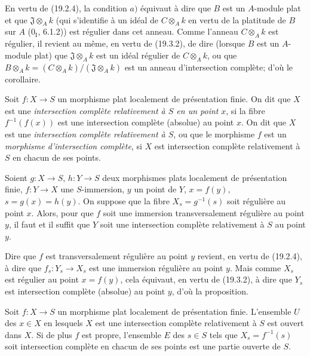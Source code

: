 
En vertu de (19.2.4), la condition $a)$ équivaut à dire que $B$ est un $A$-module plat et que $\mathfrak J\otimes_A k$ (qui s'identifie à un idéal de $C\otimes_A k$ en vertu de la platitude de $B$ sur $A$ ($0_{\mathrm I}$, 6.1.2)) est régulier dans cet anneau. Comme l'anneau $C\otimes_A k$ est régulier, il revient au même, en vertu de (19.3.2), de dire (lorsque $B$ est un $A$-module plat) que $\mathfrak J\otimes_A k$ est un idéal régulier de $C\otimes_A k$, ou que $B\otimes_A k=(C\otimes_A k)/(\mathfrak J\otimes_A k)$ est un anneau d'intersection complète; d'où le corollaire.

\begin{definition}[19.3.6]
Soit $f:X\to S$ un morphisme plat localement de présentation finie. On dit que $X$ est une \emph{intersection complète relativement à $S$ en un point} $x$, si la fibre $f^{-1}(f(x))$ est une intersection complète (absolue) au point $x$. On dit que $X$ est une \emph{intersection complète relativement à $S$}, ou que le morphisme $f$ est un \emph{morphisme d'intersection complète}, si $X$ est intersection complète relativement à $S$ en chacun de ses points.
\end{definition}

\begin{proposition}[19.3.7]
\label{IV.19.3.7}
Soient $g:X\to S$, $h:Y\to S$ deux morphismes plats localement de présentation finie, $f:Y\to X$ une $S$-immersion, $y$ un point de $Y$, $x=f(y)$, $s=g(x)=h(y)$. On suppose que la fibre $X_s=g^{-1}(s)$ soit régulière au point $x$. Alors, pour que $f$ soit une immersion transversalement régulière au point $y$, il faut et il suffit que $Y$ soit une intersection complète relativement à $S$ au point $y$.
\end{proposition}

Dire que $f$ est transversalement régulière au point $y$ revient, en vertu de (19.2.4), à dire que $f_s:Y_s\to X_s$ est une immersion régulière au point $y$. Mais comme $X_s$ est régulier au point $x=f(y)$, cela équivaut, en vertu de (19.3.2), à dire que $Y_s$ est intersection complète (absolue) au point $y$, d'où la proposition.

\begin{corollary}[19.3.8]
\label{IV.19.3.8}
Soit $f:X\to S$ un morphisme plat localement de présentation finie. L'ensemble $U$ des $x\in X$ en lesquels $X$ est une intersection complète relativement à $S$ est ouvert dans $X$. Si de plus $f$ est propre, l'ensemble $E$ des $s\in S$ tels que $X_s=f^{-1}(s)$ soit intersection complète en chacun de ses points est une partie ouverte de $S$.
\end{corollary}

